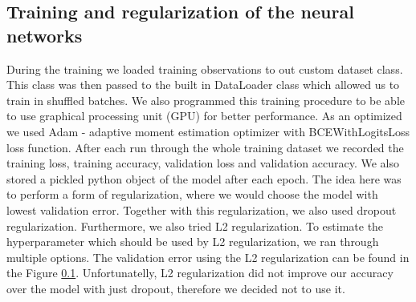 \subsection{Training and regularization of the neural networks}
During the training we loaded training observations to out custom dataset class.
This class was then passed to the built in DataLoader class which allowed us to train in shuffled batches.
We also programmed this training procedure to be able to use graphical processing unit (GPU) for better performance.
As an optimized we used Adam - adaptive moment estimation \cite{kingma2014adam} optimizer with BCEWithLogitsLoss loss function. 
After each run through the whole training dataset we recorded the training loss, training accuracy, validation loss and validation accuracy.
We also stored a pickled python object of the model after each epoch.
The idea here was to perform a form of regularization, where we would choose the model with lowest validation error.
Together with this regularization, we also used dropout regularization.
Furthermore, we also tried L2 regularization. 
To estimate the hyperparameter which should be used by L2 regularization, we ran through multiple options.
The validation error using the L2 regularization can be found in the Figure \ref{}.
Unfortunatelly, L2 regularization did not improve our accuracy over the model with just dropout, therefore we decided not to use it.


